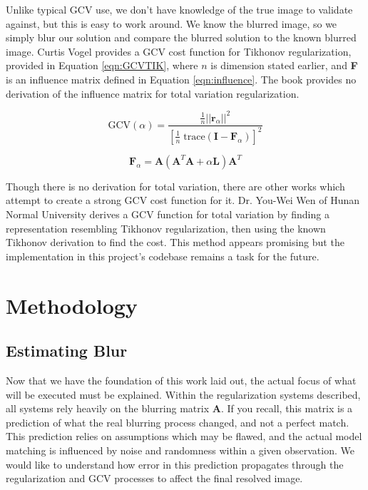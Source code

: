 \documentclass[letterpaper, 11pt, titlepage, twocolumn]{article}
\begin{document}
Unlike typical GCV use, we don't have knowledge of the true image to validate against, but this is easy to work around. We know the blurred image, so we simply blur our solution and compare the blurred solution to the known blurred image. Curtis Vogel \cite{vogel_computational_2002} provides a GCV cost function for Tikhonov regularization, provided in Equation \eqref{eqn:GCVTIK}, where $n$ is dimension stated earlier, and \textbf{F} is an influence matrix defined in Equation \eqref{eqn:influence}. The book provides no derivation of the influence matrix for total variation regularization.

\begin{equation}
  \label{eqn:GCVTIK}
  \textrm{GCV}(\alpha)=\frac{\frac{1}{n}||\mathbf{r}_\alpha||^2}{\left[\frac{1}{n}\;\textrm{trace}(\mathbf{I}-\mathbf{F}_\alpha)\right]^2}
\end{equation}

\begin{equation}
  \label{eqn:influence}
  \mathbf{F}_\alpha = \mathbf{A}\left(\mathbf{A}^T \mathbf{A} + \alpha \mathbf{L}\right)\mathbf{A}^T
\end{equation}

Though there is no derivation for total variation, there are other works which attempt to create a strong GCV cost function for it. Dr. You-Wei Wen of Hunan Normal University \cite{wen_using_2018} derives a GCV function for total variation by finding a representation resembling Tikhonov regularization, then using the known Tikhonov derivation to find the cost. This method appears promising but the implementation in this project's codebase remains a task for the future.


\section{Methodology}
\subsection{Estimating Blur}
Now that we have the foundation of this work laid out, the actual focus of what will be executed must be explained. Within the regularization systems described, all systems rely heavily on the blurring matrix \textbf{A}. If you recall, this matrix is a prediction of what the real blurring process changed, and not a perfect match. This prediction relies on assumptions which may be flawed, and the actual model matching is influenced by noise and randomness within a given observation. We would like to understand how error in this prediction propagates through the regularization and GCV processes to affect the final resolved image.
\end{document}

